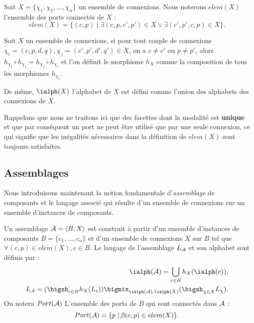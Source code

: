 Soit  $X=\{\chi_1,\chi_2,\dots,\chi_n\}$ un ensemble de
connexions. Nous noterons $elem(X)$ l'ensemble
des ports connect\'es de $X$ : 
$$
elem(X) = \{(c,p) \mid \exists
    (c,p,c',p') \in X \vee \exists (c',p',c,p) \in X\}.
$$

\begin{definition}
Soit $X$ un ensemble de connexions, si pour tout couple de connexions
$\chi_i=(c,p,d,q),\chi_j=(c',p',d',q') \in X$, on a $c\neq c'$ ou $p\neq
p'$, alors  $h_{\chi_i} \circ h_{\chi_j} =
h_{\chi_j} \circ h_{\chi_i}$ et l'on d\'efinit le morphisme $h_X$
comme la composition de tous les morphismes $h_{\chi_i}$.     

De m\^eme, $\ialph(X)$ l'alphabet de $X$ est d\'efini comme l'union des
alphabets des connexions de $X$. 
\end{definition}

Rappelons que nous ne traitons ici
que des facettes dont la modalit\'e est \textbf{unique} et que par
cons\'equent un port ne peut \^etre utilis\'e que par une seule
connexion, ce qui signifie que les in\'egalit\'es n\'ecessaires dans la d\'efinition de
$elem(X)$ sont toujours satisfaites. 

\subsection{Assemblages}

Nous introduisons maintenant la notion fondamentale
d'\emph{assemblage} de composants et le langage associ\'e qui
r\'esulte d'un ensemble de connexions sur un ensemble  d'instances de
composants.

\begin{definition}[Assemblage]
\label{def:assemblages}
    Un assemblage ${\cal A}=\langle B,X\rangle$ est construit \`a
    partir d'un ensemble d'instances de composants $B =
    \{c_1,\dots,c_n\}$ et d'un ensemble de connexions $X$ sur $B$ tel
    que $\forall (c,p) \in elem(X), c\in B$. Le langage de
    l'assemblage $L_{\cal A}$ et son alphabet sont d\'efinis par :
    \begin{eqnarray}
        \ialph({\cal A}) = \bigcup_{c\in
        B}h_X(\ialph(c)),\label{eq:alph-assemblage} \\
      L_{\cal A} = (\bigsh_{c\in B} h_X(L_c))\bigmix_{\ialph({\cal
        A}),\ialph(X)} (\bigsh_{\chi \in X} L_\chi). \label{eq:lang-assembly}
    \end{eqnarray}
On notera $Port({\cal A})$ L'ensemble des ports de $B$ qui sont
connect\'es dans $\cal A$ :
$$
Port({\cal A}) = \{ p \mid \not\exists (c,p)\in elem(X)\}.
$$
\end{definition}

